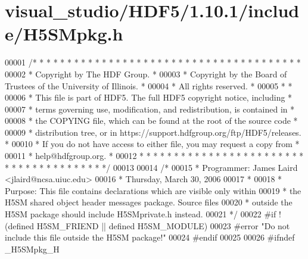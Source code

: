\hypertarget{visual__studio_2_h_d_f5_21_810_81_2include_2_h5_s_mpkg_8h_source}{}\section{visual\+\_\+studio/\+H\+D\+F5/1.10.1/include/\+H5\+S\+Mpkg.h}
\label{visual__studio_2_h_d_f5_21_810_81_2include_2_h5_s_mpkg_8h_source}

\begin{DoxyCode}
00001 \textcolor{comment}{/* * * * * * * * * * * * * * * * * * * * * * * * * * * * * * * * * * * * * * *}
00002 \textcolor{comment}{ * Copyright by The HDF Group.                                               *}
00003 \textcolor{comment}{ * Copyright by the Board of Trustees of the University of Illinois.         *}
00004 \textcolor{comment}{ * All rights reserved.                                                      *}
00005 \textcolor{comment}{ *                                                                           *}
00006 \textcolor{comment}{ * This file is part of HDF5.  The full HDF5 copyright notice, including     *}
00007 \textcolor{comment}{ * terms governing use, modification, and redistribution, is contained in    *}
00008 \textcolor{comment}{ * the COPYING file, which can be found at the root of the source code       *}
00009 \textcolor{comment}{ * distribution tree, or in https://support.hdfgroup.org/ftp/HDF5/releases.  *}
00010 \textcolor{comment}{ * If you do not have access to either file, you may request a copy from     *}
00011 \textcolor{comment}{ * help@hdfgroup.org.                                                        *}
00012 \textcolor{comment}{ * * * * * * * * * * * * * * * * * * * * * * * * * * * * * * * * * * * * * * */}
00013 
00014 \textcolor{comment}{/*}
00015 \textcolor{comment}{ * Programmer:  James Laird <jlaird@ncsa.uiuc.edu>}
00016 \textcolor{comment}{ *              Thursday, March 30, 2006}
00017 \textcolor{comment}{ *}
00018 \textcolor{comment}{ * Purpose:     This file contains declarations which are visible only within}
00019 \textcolor{comment}{ *              the H5SM shared object header messages package.  Source files}
00020 \textcolor{comment}{ *              outside the H5SM package should include H5SMprivate.h instead.}
00021 \textcolor{comment}{ */}
00022 \textcolor{preprocessor}{#if !(defined H5SM\_FRIEND || defined H5SM\_MODULE)}
00023 \textcolor{preprocessor}{#error "Do not include this file outside the H5SM package!"}
00024 \textcolor{preprocessor}{#endif}
00025 
00026 \textcolor{preprocessor}{#ifndef \_H5SMpkg\_H}

\end{DoxyCode}
